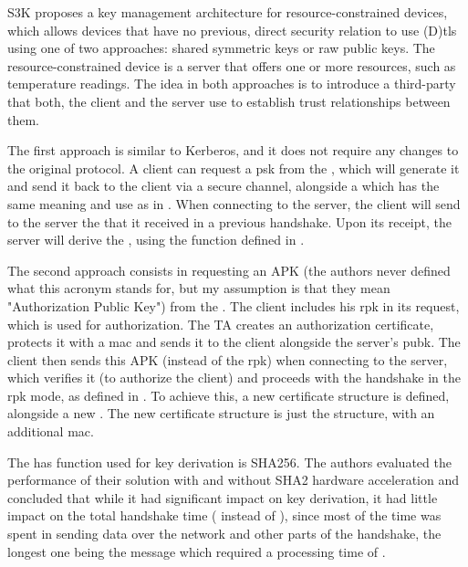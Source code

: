 \documentclass{llncs}
\begin{document}
S3K\cite{S3KScala62:online} proposes a key management architecture for resource-constrained devices,
which allows devices that have no previous, direct security relation to use
(D)\gls{tls} using one of two approaches: shared symmetric keys or raw public keys.
The resource-constrained device is a server that offers one or more resources,
such as temperature readings. The idea in both approaches is to introduce a third-party
 that both, the client and the server use to establish
trust relationships between them.

The first approach is similar to Kerberos\cite{RFC4120}, and it does not require any
changes to the original protocol. A client can request a \gls{psk}  from the ,
which will generate it and send it back to the client via a secure channel, alongside
a  which has the same meaning and use as in \cite{RFC4279}. When connecting to the server,
the client will send to the server the  that it received in a previous
handshake. Upon its receipt, the server will derive the , using the
 function defined in \cite{RFC5246}.

The second approach consists in requesting an APK (the authors never defined
what this acronym stands for, but my assumption is that they mean "Authorization Public Key")
from the . The client includes his \gls{rpk} in its request, which is used for authorization. The TA
creates an authorization certificate, protects it with a \gls{mac} and sends it
to the client alongside the server's \gls{pubk}.
The client then sends this APK (instead of the \gls{rpk})
when connecting to the server, which verifies it (to authorize the client)
and proceeds with the handshake in the \gls{rpk} mode, as defined in  \cite{RFC4279}.
To achieve this, a new certificate structure is defined, alongside a new .
The new certificate structure is just the  \cite{RFC7250} structure, with an
additional \gls{mac}.

The has function used for key derivation is SHA256. The authors evaluated the
performance of their solution with and without SHA2 hardware acceleration and
concluded that while it had significant impact on key derivation, it had little
impact on the total handshake time ( instead of ), since most of the time was spent in sending
data over the network and other parts of the handshake, the longest one being
the  message which required a processing time
of .
\end{document}
